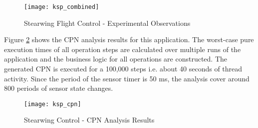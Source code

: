 \begin{figure}[h]
	\centering
	\texttt{[image: ksp\_combined]}
	\caption{Stearwing Flight Control - Experimental Observations}
	\label{fig:ksp_combined}
\end{figure} 
\FloatBarrier 

Figure \ref{fig:ksp_cpn} shows the CPN analysis results for this application. The worst-case pure execution times of all operation steps are calculated over multiple runs of the application and the business logic for all operations are constructed. The generated CPN is executed for a 100,000 steps i.e. about 40 seconds of thread activity. Since the period of the sensor timer is 50 ms, the analysis cover around 800 periods of sensor state changes. 

\begin{figure}[h]
	\centering
	\texttt{[image: ksp\_cpn]}
	\caption{Stearwing Control - CPN Analysis Results}
	\label{fig:ksp_cpn}
\end{figure} 
\FloatBarrier 

